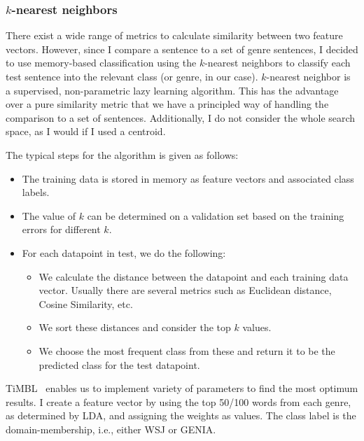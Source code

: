 
	
\subsubsection{ $k$-nearest neighbors} 
There exist a wide range of metrics to calculate similarity between two feature vectors. However, since I compare a sentence to a set of genre sentences, I decided to use memory-based classification using the  $k$-nearest neighbors to classify each test sentence into the relevant class (or genre, in our case). $k$-nearest neighbor is a supervised, non-parametric lazy learning algorithm. This has the advantage over a pure similarity metric that we have a principled way of handling the comparison to a set of sentences. Additionally, I do not consider the whole search space, as I would if I used a centroid.
	
 The typical steps for the algorithm is given as follows:

\begin{itemize}
    \item  The training data is stored in memory as feature vectors and associated class labels.
    \item The value of $k$ can be determined on a validation set based on the training errors for different $k$.
    \item For each datapoint in test, we do the following:
    \begin{itemize}
        \item We calculate the distance between the datapoint and each training data vector. Usually there are several metrics such as Euclidean distance, Cosine Similarity, etc.
        \item We sort these distances and consider the top $k$ values. 
        \item We choose the most frequent class from these and return it to be the predicted class for the test datapoint.
    \end{itemize}
\end{itemize}

TiMBL~\citep{daelemans1998timbl} enables us to implement variety of parameters to find the most optimum results. %
I create a feature vector by using the top 50/100 words from each genre, as determined by LDA, and assigning the weights as values. The class label is the domain-membership, i.e., either WSJ or GENIA.

